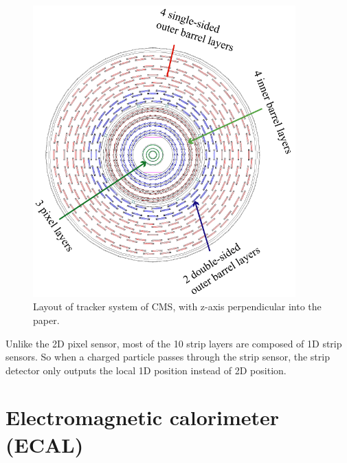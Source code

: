 \begin{figure}[!htbp]
\centering
\includegraphics[width=0.9\textwidth]{figures/Strip.png}
\caption{Layout of tracker system of CMS, with z-axis perpendicular into the paper.}
\label{fig:Strip}
\end{figure}


Unlike the 2D pixel sensor, most of the 10 strip layers are composed of 1D strip sensors. So when a charged particle passes through the strip sensor, the strip detector only outputs the local 1D position instead of 2D position. 



\section{Electromagnetic calorimeter (ECAL) }



